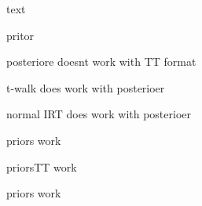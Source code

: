 \begin{figure}[h]
	\centering
	\scalebox{0.66}{}
	\caption[]{text}
	\label{fig:Results}
\end{figure}



\begin{figure}[h]
	\centering
	\scalebox{0.66}{}
	\caption[]{pritor}
	\label{fig:Results}
\end{figure}

\begin{figure}[h]
	\centering
	\scalebox{0.66}{}
	\caption[]{posteriore doesnt work with TT format}
	\label{fig:Results}
\end{figure}


\begin{figure}[h]
	\centering
	\scalebox{0.66}{}
	\caption[]{t-walk does work with posterioer}
	\label{fig:Results}
\end{figure}

\begin{figure}[h]
	\centering
	\scalebox{0.66}{}
	\caption[]{normal IRT does work with posterioer}
	\label{fig:Results}
\end{figure}


\begin{figure}[h]
	\centering
	\scalebox{1}{}
	\caption[]{priors work}
	\label{fig:Results}
\end{figure}


\begin{figure}[h]
	\centering
	\scalebox{1}{}
	\caption[]{priorsTT work}
	\label{fig:Results}
\end{figure}


\begin{figure}[h]
	\centering
	\scalebox{1}{}
	\caption[]{priors work}
	\label{fig:Results}
\end{figure}


